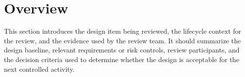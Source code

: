 \section{Overview}
This section introduces the design item being reviewed, the lifecycle context for
the review, and the evidence used by the review team.  It should summarize the
design baseline, relevant requirements or risk controls, review participants, and
the decision criteria used to determine whether the design is acceptable for the
next controlled activity.
